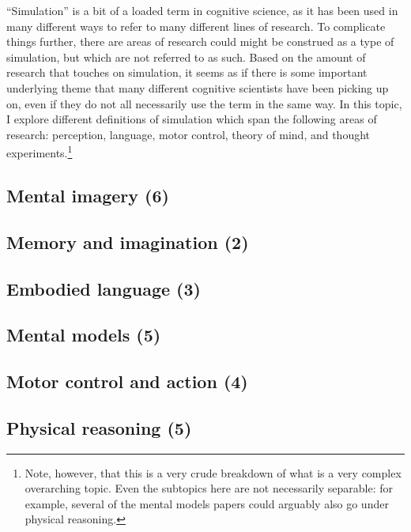 \documentclass{article}
\begin{document}
``Simulation'' is a bit of a loaded term in cognitive science, as it has been used in many different ways to refer to many different lines of research.
To complicate things further, there are areas of research could might be construed as a type of simulation, but which are not referred to as such.
Based on the amount of research that touches on simulation, it seems as if there is some important underlying theme that many different cognitive scientists have been picking up on, even if they do not all necessarily use the term in the same way.
In this topic, I explore different definitions of simulation which span the following areas of research: perception, language, motor control, theory of mind, and thought experiments.\footnote{Note, however, that this is a very crude breakdown of what is a very complex overarching topic.
Even the subtopics here are not necessarily separable: for example, several of the mental models papers could arguably also go under physical reasoning.}


\subsection{Mental imagery (6)}

\subsection{Memory and imagination (2)}

\subsection{Embodied language (3)}

\subsection{Mental models (5)}

\subsection{Motor control and action (4)}

\subsection{Physical reasoning (5)}
\end{document}
